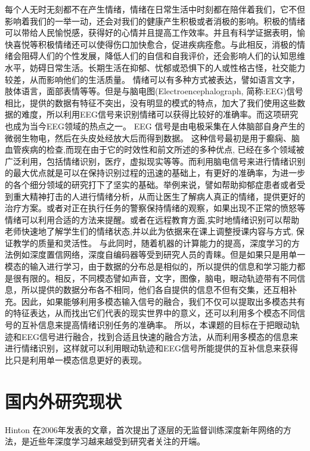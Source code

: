 	每个人无时无刻都不在产生情绪，情绪在日常生活中时刻都在陪伴着我们，它不但影响着我们的一举一动，还会对我们的健康产生积极或者消极的影响。积极的情绪可以带给人民愉悦感，获得好的心情并且提高工作效率。并且有科学证据表明，愉快喜悦等积极情绪还可以使得伤口加快愈合，促进疾病痊愈。与此相反，消极的情绪会阻碍人们的个性发展，降低人们的自信和自我评价，还会影响人们的认知思维水平，妨碍日常生活。长期生活在抑郁、忧郁或恐惧下的人或性格古怪，社交能力较差，从而影响他们的生活质量。
	情绪可以有多种方式被表达，譬如语言文字，肢体语言，面部表情等等。但是与脑电图(Electroencephalograph, 简称:EEG)信号相比，提供的数据有特征不突出，没有明显的模式的特点，加大了我们使用这些数据的难度，所以利用EEG信号来识别情绪可以获得比较好的准确率。而这项研究也成为当今EEG领域的热点之一。
	EEG 信号是由电极采集在人体脑部自身产生的微弱生物电，然后在头皮处经放大后而得到数据。 这种信号最初是用于癫痫、脑血管疾病的检查,而现在由于它的时效性和前文所述的多种优点, 已经在多个领域被广泛利用，包括情绪识别，医疗，虚拟现实等等。而利用脑电信号来进行情绪识别的最大优点就是可以在保持识别过程的迅速的基础上，有更好的准确率，为进一步的各个细分领域的研究打下了坚实的基础。举例来说，譬如帮助抑郁症患者或者受到重大精神打击的人进行情绪分析，从而让医生了解病人真正的情绪，提供更好的治疗方案。或者对正在执行任务的警察保持情绪的观察，如果出现不正常的愤怒等情绪可以利用合适的方法来提醒。或者在远程教育方面,实时地情绪识别可以帮助老师快速地了解学生们的情绪状态,并以此为依据来在课上调整授课内容与方式, 保证教学的质量和灵活性。
	与此同时，随着机器的计算能力的提高，深度学习的方法例如深度置信网络，深度自编码器等受到研究人员的青睐。但是如果只是用单一模态的输入进行学习，由于数据的分布总是相似的，所以提供的信息和学习能力都是很有限的。相反，不同模态譬如声音，文字，图像，脑电，眼动轨迹带有不同信息，所以提供的数据分布各不相同，他们各自提供的信息不但有交集，还互相补充。因此，如果能够利用多模态输入信号的融合，我们不仅可以提取出多模态共有的特征表达，从而找出它们代表的现实世界中的意义，还可以利用多个模态不同信号的互补信息来提高情绪识别任务的准确率。
	所以，本课题的目标在于把眼动轨迹和EEG信号进行融合，找到合适且快速的融合方法，从而利用多模态的信息来进行情绪识别，这样就可以利用眼动轨迹和EEG信号所能提供的互补信息来获得比只是利用单一模态信息更好的表现。
	
\section{国内外研究现状}

	Hinton 在2006年发表的文章，首次提出了逐层的无监督训练深度新年网络的方法，是近些年深度学习越来越受到研究者关注的开端。
	
